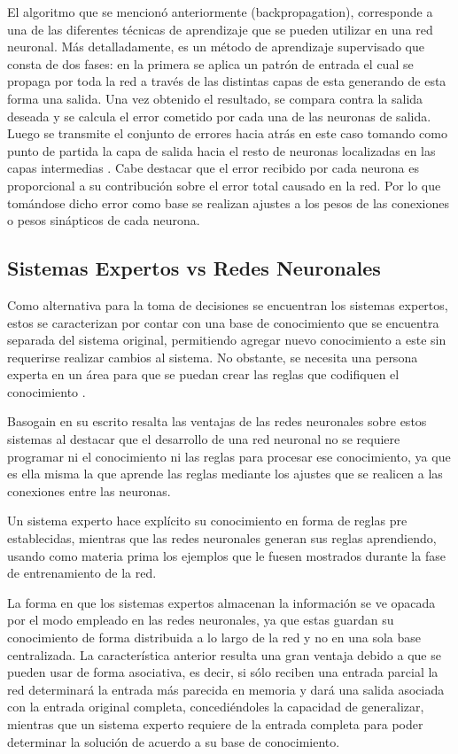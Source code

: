 	El algoritmo que se mencion\'{o} anteriormente (backpropagation), corresponde a
	una de las diferentes t\'{e}cnicas de aprendizaje que se pueden utilizar en una
	red neuronal. M\'{a}s detalladamente, es un m\'{e}todo de aprendizaje
	supervisado que consta de dos fases: en la primera se aplica un patr\'{o}n de entrada el cual se propaga por toda la red a trav\'{e}s de
las distintas capas de esta generando de esta forma una salida. Una vez obtenido
el resultado, se compara contra la salida deseada y se calcula el error cometido
por cada una de las neuronas de salida. Luego se transmite el conjunto de
errores hacia atr\'{a}s en este caso tomando como punto de partida la capa de
salida hacia el resto de neuronas localizadas en las capas intermedias
\cite{Fritsch1996}. Cabe destacar que el error recibido por cada neurona es
proporcional a su contribuci\'{o}n sobre el error total causado en la red. Por lo que tom\'{a}ndose dicho error como base se realizan ajustes a los pesos de las conexiones o pesos sin\'{a}pticos de cada neurona.

\subsection{Sistemas Expertos vs Redes Neuronales}
 
 		Como alternativa para la toma de decisiones se encuentran los sistemas
 	expertos, estos se caracterizan por contar con una base de conocimiento que
 	se encuentra separada del sistema original, permitiendo agregar nuevo
 	conocimiento a este sin requerirse realizar cambios al sistema. No obstante, se necesita una persona experta en un \'{a}rea para que se puedan crear las reglas que codifiquen el conocimiento \cite{Basogain}.
 	
 		Basogain en su escrito resalta las ventajas de las redes neuronales sobre
 	estos sistemas al destacar que el desarrollo de una red neuronal no se
 	requiere programar ni el conocimiento ni las reglas para procesar ese
 	conocimiento, ya que es ella misma la que aprende las reglas mediante los ajustes que se realicen a las conexiones entre las neuronas.
 		
 		Un sistema experto hace expl\'{i}cito su conocimiento en forma de reglas pre
 	establecidas, mientras que las redes neuronales generan sus reglas
 	aprendiendo, usando como materia prima los ejemplos que le fuesen mostrados
 	durante la fase de entrenamiento de la red.
 		
 			La forma en que los sistemas expertos almacenan la informaci\'{o}n se ve opacada
 	por el modo empleado en las redes neuronales, ya que estas guardan su
 	conocimiento de forma distribuida a lo largo de la red y no en una sola base
 	centralizada. La caracter\'{i}stica anterior resulta una gran ventaja debido a que se pueden usar de forma asociativa, es decir, si s\'{o}lo reciben una entrada parcial la red determinar\'{a} la entrada m\'{a}s parecida en memoria y dar\'{a} una salida asociada con la entrada original completa, concedi\'{e}ndoles la capacidad de generalizar, mientras que un sistema experto requiere de la entrada completa para poder determinar la soluci\'{o}n de acuerdo a su base de conocimiento.

